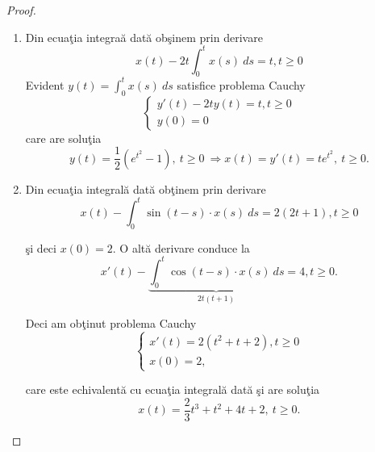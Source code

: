 \documentclass[a4paper,12pt,oneside]{report}
\begin{document}
\begin{proof}
\begin{enumerate}[label=(\alph*)]
  \item Din ecua\c{t}ia integra\u{a} dat\u{a} ob\c{s}inem prin derivare
\begin{displaymath}
x\left ( t \right ) -2t \int_{0}^{t}x\left ( s \right )\ ds = t, t\geq 0
\end{displaymath}
Evident \(y\left ( t \right ) = \int_{0}^{t}x\left ( s \right )  \ ds\) satisfice problema Cauchy
        \begin{displaymath}
        	\left\{\begin{matrix}
        	{y}'\left ( t \right ) - 2ty\left ( t \right ) = t, t\geq 0\\
        	y\left ( 0 \right ) = 0
        	\end{matrix}\right.
        \end{displaymath}
care are solu\c{t}ia
\begin{displaymath}
y\left ( t \right ) = \frac{1}{2}\left ( e^{t^{2}}- 1 \right ),~ t\geq 0~\Rightarrow x\left ( t \right )=y'(t) = te^{t^{2}},~ t\geq 0.
\end{displaymath}

  \item Din ecua\c{t}ia integral\u{a} dat\u{a} ob\c{t}inem prin derivare
        \begin{displaymath}
        	x\left ( t \right ) - \int_{0}^{t}\sin \left ( t-s \right )\cdot x\left ( s \right ) \ ds = 2\left ( 2t + 1 \right ), t\geq 0
        \end{displaymath}

        \c{s}i deci \(x\left ( 0 \right ) = 2\). O alt\u{a} derivare conduce la
        \begin{displaymath}
        	{x}'\left ( t  \right ) - \underbrace{\int_{0}^{t}\cos \left ( t-s \right ) \cdot  x\left ( s \right ) \ ds}_{2t\left ( t+1 \right )} = 4, t\geq 0.
        \end{displaymath}

        Deci am ob\c{t}inut problema Cauchy
        \begin{displaymath}
        	\left\{\begin{matrix}
        	{x}'\left ( t \right ) = 2\left ( t^{2} + t + 2 \right ), t\geq 0\\
        	x\left ( 0 \right ) = 2,
        	\end{matrix}\right.
        \end{displaymath}

        care este echivalent\u{a} cu ecua\c{t}ia integral\u{a} dat\u{a} \c{s}i are solu\c{t}ia
        \begin{displaymath}
        	x\left ( t \right ) = \frac{2}{3}t^{3} + t^{2} + 4t + 2,~ t\geq 0.
        \end{displaymath}
\end{enumerate}
\end{proof}	
\end{document}
